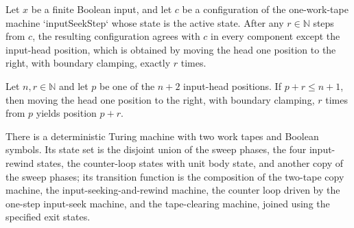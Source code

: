 \begin{theorem}
\label{Turing.inputSeekStep_run}
\leanok
{}
Let $x$ be a finite Boolean input, and let $c$ be a configuration of the one-work-tape
machine `inputSeekStep` whose state is the active state. After any $r\in\mathbb{N}$
steps from $c$, the resulting configuration agrees with $c$ in every component except
the input-head position, which is obtained by moving the head one position to the right,
with boundary clamping, exactly $r$ times.
\end{theorem}

\begin{theorem}
\label{Turing.inputSeek_right_value}
\leanok
{}
Let $n,r\in\mathbb{N}$ and let $p$ be one of the $n+2$ input-head positions. If $p+r\le
n+1$, then moving the head one position to the right, with boundary clamping, $r$ times
from $p$ yields position $p+r$.
\end{theorem}

\begin{definition}
\label{Turing.inputSeekMachine}
\leanok
{}
There is a deterministic Turing machine with two work tapes and Boolean symbols. Its
state set is the disjoint union of the sweep phases, the four input-rewind states, the
counter-loop states with unit body state, and another copy of the sweep phases; its
transition function is the composition of the two-tape copy machine, the
input-seeking-and-rewind machine, the counter loop driven by the one-step input-seek
machine, and the tape-clearing machine, joined using the specified exit states.
\end{definition}

